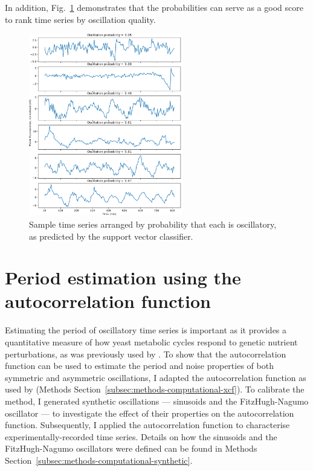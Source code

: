 In addition, Fig.\ \ref{fig:analysis-svc-proba-gallery} demonstrates that the probabilities can serve as a good score to rank time series by oscillation quality.

\begin{figure}[h!]
  \centering
  \includegraphics[width=0.6\textwidth]{svm_3_edit.pdf}

  \caption{
    Sample time series arranged by probability that each is oscillatory, as predicted by the support vector classifier.
  }
  \label{fig:analysis-svc-proba-gallery}
\end{figure}


\section{Period estimation using the autocorrelation function}
\label{sec:analysis-characterisation}

Estimating the period of oscillatory time series is important as it provides a quantitative measure of how yeast metabolic cycles respond to genetic nutrient perturbations, as was previously used by \textcite{papagiannakisAutonomousMetabolicOscillations2017}.
To show that the autocorrelation function can be used to estimate the period and noise properties of both symmetric and asymmetric oscillations, I adapted the autocorrelation function as used by \textcite{pietschDeterminingGrowthRates2023} (Methods Section~\ref{subsec:methods-computational-xcf}).
To calibrate the method, I generated synthetic oscillations --- sinusoids and the FitzHugh-Nagumo oscillator \parencite{fitzhughImpulsesPhysiologicalStates1961} --- to investigate the effect of their properties on the autocorrelation function.
Subsequently, I applied the autocorrelation function to characterise experimentally-recorded time series.
Details on how the sinusoids and the FitzHugh-Nagumo oscillators were defined can be found in Methods Section~\ref{subsec:methods-computational-synthetic}.

